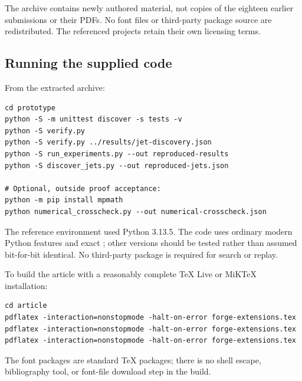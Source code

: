 The archive contains newly authored material, not copies of the eighteen earlier submissions or their PDFs. No font files or third-party package source are redistributed. The referenced projects retain their own licensing terms.

\subsection{Running the supplied code}
From the extracted archive:
\par\noindent\begin{minipage}{\linewidth}
\begin{lstlisting}
cd prototype
python -S -m unittest discover -s tests -v
python -S verify.py
python -S verify.py ../results/jet-discovery.json
python -S run_experiments.py --out reproduced-results
python -S discover_jets.py --out reproduced-jets.json

# Optional, outside proof acceptance:
python -m pip install mpmath
python numerical_crosscheck.py --out numerical-crosscheck.json
\end{lstlisting}
\end{minipage}\par
The reference environment used Python 3.13.5. The code uses ordinary modern Python features and exact ; other versions should be tested rather than assumed bit-for-bit identical. No third-party package is required for search or replay.

To build the article with a reasonably complete TeX Live or MiKTeX installation:
\par\noindent\begin{minipage}{\linewidth}
\begin{lstlisting}
cd article
pdflatex -interaction=nonstopmode -halt-on-error forge-extensions.tex
pdflatex -interaction=nonstopmode -halt-on-error forge-extensions.tex
pdflatex -interaction=nonstopmode -halt-on-error forge-extensions.tex
\end{lstlisting}
\end{minipage}\par
The font packages are standard TeX packages; there is no shell escape, bibliography tool, or font-file download step in the build.

